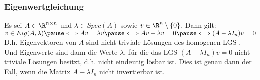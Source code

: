%
%
\begin{frame}\frametitle{Eigenwertgleichung}
Es sei $A\in \R^{n\times n}$ und $\lambda \in Spec(A)$ sowie $v \in \R^n\setminus \{0\}$. Dann gilt:\\\vfill 
$
v \in Eig(A,\lambda)\pause \Longleftrightarrow Av=\lambda v \pause \Longleftrightarrow Av-\lambda v=0 \pause\Longleftrightarrow (A-\lambda I_n)v=0
$\pause
\vfill
D.h. Eigenvektoren von $A$ sind nicht-triviale Lösungen des homogenen LGS .\\\vfill\pause
Und Eigenwerte sind dann die Werte $\lambda$, für die das LGS $(A-\lambda I_n)v=0$ nicht-triviale Lösungen besitzt, d.h. nicht eindeutig lösbar ist. \pause Dies ist genau dann der Fall, wenn die Matrix $A-\lambda I_n$ \underline{nicht} invertierbar ist.
\end{frame}
%
